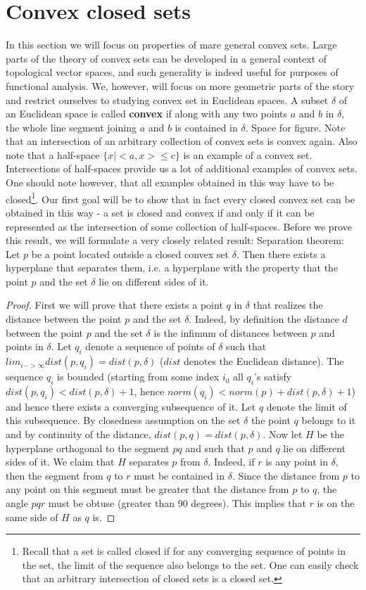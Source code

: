 \section{Convex closed sets}
In this section we will focus on properties of mare general convex sets.
Large parts of the theory of convex sets can be developed in a general context of topological vector spaces, and such generality is indeed useful for purposes of functional analysis. We, however, will focus on more geometric parts of the story and restrict ourselves to studying convex set in Euclidean spaces.
A subset $\delta$ of an Euclidean space is called \textbf{convex} if along with any two points $a$ and $b$ in $\delta$, the whole line segment joining $a$ and $b$ is contained in $\delta$.
Space for figure.
Note that an intersection of an arbitrary collection of convex sets is convex again.
Also note that a half-space $\{x|<a,x>\leq c\}$ is an example of a convex set. Intersections of half-spaces provide us a lot of additional examples of convex sets.
One should note however, that all examples obtained in this way have to be closed\footnote{Recall that a set is called closed if for any converging sequence of points in the set, the limit of the sequence also belongs to the set. One can easily check that an arbitrary intersection of closed sets is a closed set.}.
Our first goal will be to show that in fact every closed convex set can be obtained in this way - a set is closed and convex if and only if it can be represented as the intersection of some collection of half-spaces.
Before we prove this result, we will formulate a very closely related result:
Separation theorem: Let $p$ be a point located outside a closed convex set $\delta$. Then there exists a hyperplane that separates them, i.e. a hyperplane with the property that the point $p$ and the set $\delta$ lie on different sides of it.
\begin{proof}
First we will prove that there exists a point $q$ in $\delta$ that realizes the distance between the point $p$ and the set $\delta$. Indeed, by definition the distance $d$ between the point $p$ and the set $\delta$ is the infimum of distances between $p$ and points in $\delta$. Let $q_i$ denote a sequence of points of $\delta$ such that $lim_{i->\infty}{dist(p,q_i)}=dist(p,\delta)$ ($dist$ denotes the Euclidean distance). The sequence $q_i$ is bounded (starting from some index $i_0$ all $q_i$'s satisfy $dist(p,q_i)<dist(p,\delta)+1$, hence $norm(q_i)<norm(p)+dist(p,\delta)+1$) and hence there exists a converging subsequence of it. Let $q$ denote the limit of this subsequence. By closedness assumption on the set $\delta$ the point $q$ belongs to it and by continuity of the distance, $dist(p,q)=dist(p,\delta)$.
Now let $H$ be the hyperplane orthogonal to the segment $p q$ and such that $p$ and $q$ lie on different sides of it. We claim that $H$ separates $p$ from $\delta$. Indeed, if $r$ is any point in $\delta$, then the segment from $q$ to $r$ must be contained in $\delta$. Since the distance from $p$ to any point on this segment must be greater that the distance from $p$ to $q$, the angle $p q r$ must be obtuse (greater than 90 degrees). This implies that $r$ is on the same side of $H$ as $q$ is.
\end{proof}
